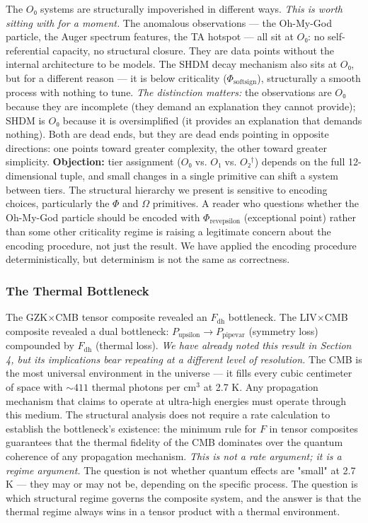 \documentclass[12pt,a4paper]{article}
\begin{document}
The $O₀$ systems are structurally impoverished in different ways. \emph{This is worth sitting with for a moment.} The anomalous observations --- the Oh-My-God particle, the Auger spectrum features, the TA hotspot --- all sit at $O₀$: no self-referential capacity, no structural closure. They are data points without the internal architecture to be models. The SHDM decay mechanism also sits at $O₀$, but for a different reason --- it is below criticality ($\Phi_{\text{softsign}}$), structurally a smooth process with nothing to tune. \emph{The distinction matters:} the observations are $O₀$ because they are incomplete (they demand an explanation they cannot provide); SHDM is $O₀$ because it is oversimplified (it provides an explanation that demands nothing). Both are dead ends, but they are dead ends pointing in opposite directions: one points toward greater complexity, the other toward greater simplicity. \textbf{Objection:} tier assignment ($O₀$ vs. $O₁$ vs. $O₂^\dagger$) depends on the full 12-dimensional tuple, and small changes in a single primitive can shift a system between tiers. The structural hierarchy we present is sensitive to encoding choices, particularly the $\Phi$ and $\Omega$ primitives. A reader who questions whether the Oh-My-God particle should be encoded with $\Phi_{\text{revepsilon}}$ (exceptional point) rather than some other criticality regime is raising a legitimate concern about the encoding procedure, not just the result. We have applied the encoding procedure deterministically, but determinism is not the same as correctness.

\subsubsection{The Thermal Bottleneck}

The GZK$\times$CMB tensor composite revealed an $F_{\text{dh}}$ bottleneck. The LIV$\times$CMB composite revealed a dual bottleneck: $P_{\text{upsilon}} \to P_{\text{pipevar}}$ (symmetry loss) compounded by $F_{\text{dh}}$ (thermal loss). \emph{We have already noted this result in Section 4, but its implications bear repeating at a different level of resolution.} The CMB is the most universal environment in the universe --- it fills every cubic centimeter of space with $\sim 411$ thermal photons per cm$^3$ at 2.7 K. Any propagation mechanism that claims to operate at ultra-high energies must operate through this medium. The structural analysis does not require a rate calculation to establish the bottleneck's existence: the minimum rule for $F$ in tensor composites guarantees that the thermal fidelity of the CMB dominates over the quantum coherence of any propagation mechanism. \emph{This is not a rate argument; it is a regime argument.} The question is not whether quantum effects are "small" at 2.7 K --- they may or may not be, depending on the specific process. The question is which structural regime governs the composite system, and the answer is that the thermal regime always wins in a tensor product with a thermal environment.
\end{document}
